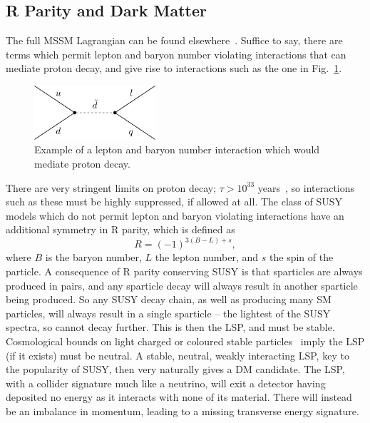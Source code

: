 \subsection{R Parity and Dark Matter\label{th:RParity}}
The full \ac{MSSM} Lagrangian can be found elsewhere~\cite{susyandsuch}. 
Suffice to say, there are terms which permit lepton and baryon number violating interactions that can mediate proton decay, and give rise to interactions such as the one in Fig.~\ref{fig:pdecay}.
\begin{figure}[htbp]
  \begin{center}
  \includegraphics[width=0.4\textwidth]{Figures/theory/RPVpdecay}
  \caption{Example of a lepton and baryon number interaction which would mediate proton decay.}
  \label{fig:pdecay}
  \end{center}
\end{figure}
There are very stringent limits on proton decay; $\tau > 10^{33}$ years~\cite{PDG}, so interactions such as these must be highly suppressed, if allowed at all. 
The class of \ac{SUSY} models which do not permit lepton and baryon violating interactions have an additional symmetry in R parity, which is defined as
\begin{equation}
R = (-1)^{3(B-L)+s},
\end{equation}
where $B$ is the baryon number, $L$ the lepton number, and $s$ the spin of the particle.
A consequence of R parity conserving \ac{SUSY} is that sparticles are always produced in pairs, and any sparticle decay will always result in another sparticle being produced.
So any \ac{SUSY} decay chain, as well as producing many \ac{SM} particles, will always result in a single sparticle -- the lightest of the \ac{SUSY} spectra, so cannot decay further.
This is then the \ac{LSP}, and must be stable.
Cosmological bounds on light charged or coloured stable particles~\cite{PDG} imply the \ac{LSP} (if it exists) must be neutral.
A stable, neutral, weakly interacting \ac{LSP}, key to the popularity of \ac{SUSY}, then very naturally gives a \ac{DM} candidate.
The \ac{LSP}, with a collider signature much like a neutrino, will exit a detector having deposited no energy as it interacts with none of its material.
There will instead be an imbalance in momentum, leading to a missing transverse energy signature.

